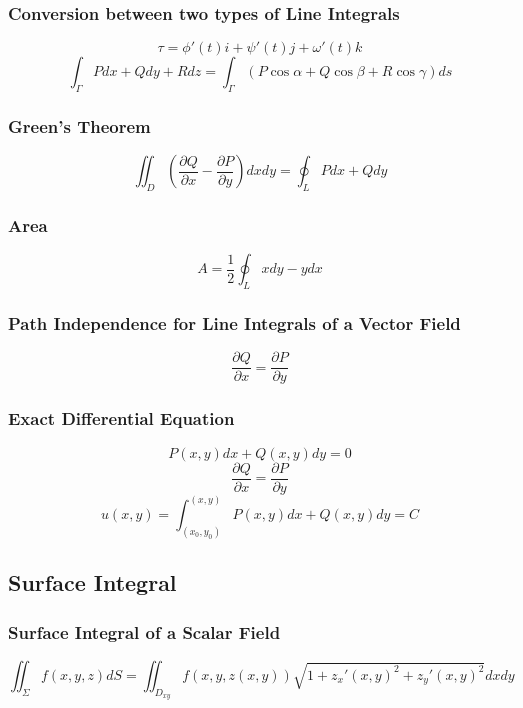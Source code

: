 \documentclass{article}
\begin{document}
\subsubsection{Conversion between two types of Line Integrals}

\[
    \tau = \phi'(t) i + \psi'(t) j + \omega'(t) k
\]
\[
    \int_\Gamma P dx + Q dy + R dz = \int_\Gamma (P \cos \alpha + Q \cos \beta + R \cos \gamma) ds
\]

\subsubsection{Green's Theorem}

\[
    \iint_D \left(\frac{\partial Q}{\partial x} - \frac{\partial P}{\partial y}\right) dx dy = \oint_L P dx + Q dy
\]

\subsubsection{Area}

\[
    A = \frac{1}{2} \oint_L x dy - y dx
\]

\subsubsection{Path Independence for Line Integrals of a Vector Field}

\[
    \frac{\partial Q}{\partial x} = \frac{\partial P}{\partial y}
\]

\subsubsection{Exact Differential Equation}

\[
    P(x, y) dx + Q(x, y) dy = 0
\]
\[
    \frac{\partial Q}{\partial x} = \frac{\partial P}{\partial y}
\]
\[
    u(x, y) = \int_{(x_0, y_0)}^{(x, y)} P(x, y) dx + Q(x, y) dy = C
\]

\subsection{Surface Integral}

\subsubsection{Surface Integral of a Scalar Field}

\[
    \iint_\Sigma f(x, y, z) dS = \iint_{D_{xy}} f(x, y, z(x, y)) \sqrt{1 + z_x'(x, y)^2 + z_y'(x, y)^2} dx dy
\]
\end{document}
